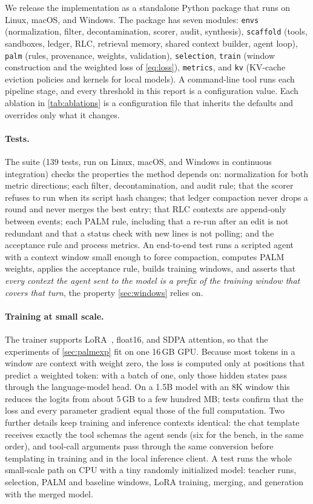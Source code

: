 \documentclass[11pt]{article}
\newcommand{\code}[1]{\texttt{#1}}
\begin{document}
We release the implementation as a standalone Python package that runs on Linux, macOS, and Windows. The package has seven modules: \code{envs} (normalization, filter, decontamination, scorer, audit, synthesis), \code{scaffold} (tools, sandboxes, ledger, RLC, retrieval memory, shared context builder, agent loop), \code{palm} (rules, provenance, weights, validation), \code{selection}, \code{train} (window construction and the weighted loss of \cref{eq:loss}), \code{metrics}, and \code{kv} (KV-cache eviction policies and kernels for local models). A command-line tool runs each pipeline stage, and every threshold in this report is a configuration value. Each ablation in \cref{tab:ablations} is a configuration file that inherits the defaults and overrides only what it changes.

\paragraph{Tests.} The suite (139 tests, run on Linux, macOS, and Windows in continuous integration) checks the properties the method depends on: normalization for both metric directions; each filter, decontamination, and audit rule; that the scorer refuses to run when its script hash changes; that ledger compaction never drops a round and never merges the best entry; that RLC contexts are append-only between events; each PALM rule, including that a re-run after an edit is not redundant and that a status check with new lines is not polling; and the acceptance rule and process metrics. An end-to-end test runs a scripted agent with a context window small enough to force compaction, computes PALM weights, applies the acceptance rule, builds training windows, and asserts that \emph{every context the agent sent to the model is a prefix of the training window that covers that turn}, the property \cref{sec:windows} relies on.

\paragraph{Training at small scale.} The trainer supports LoRA~\citep{hu2022lora}, float16, and SDPA attention, so that the experiments of \cref{sec:palmexp} fit on one 16\,GB GPU. Because most tokens in a window are context with weight zero, the loss is computed only at positions that predict a weighted token: with a batch of one, only those hidden states pass through the language-model head. On a 1.5B model with an 8K window this reduces the logits from about 5\,GB to a few hundred MB; tests confirm that the loss and every parameter gradient equal those of the full computation. Two further details keep training and inference contexts identical: the chat template receives exactly the tool schemas the agent sends (six for the bench, in the same order), and tool-call arguments pass through the same conversion before templating in training and in the local inference client. A test runs the whole small-scale path on CPU with a tiny randomly initialized model: teacher runs, selection, PALM and baseline windows, LoRA training, merging, and generation with the merged model.
\end{document}
